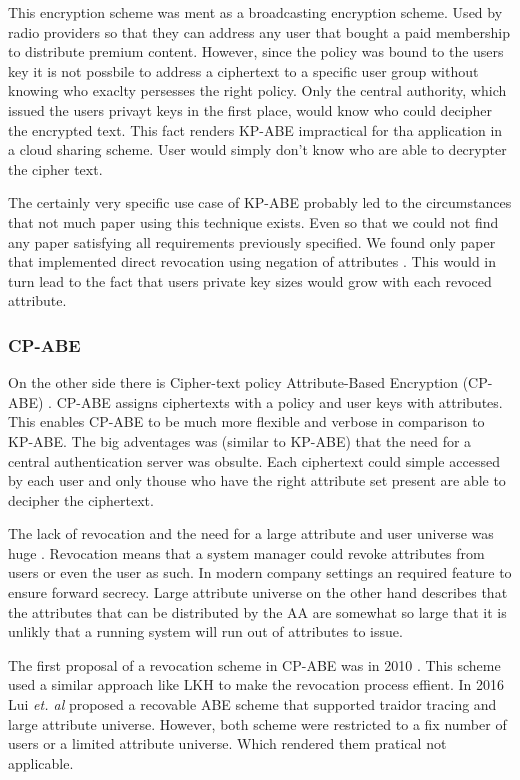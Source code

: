 This encryption scheme was ment as a broadcasting encryption scheme. Used by radio providers so that they can address any user that bought a paid membership to distribute premium content. However, since the policy was bound to the users key it is not possbile to address a ciphertext to a specific user group without knowing who exaclty persesses the right policy. Only the central authority, which issued the users privayt keys in the first place, would know who could decipher the encrypted text. This fact renders \ac{KP-ABE} impractical for tha application in a cloud sharing scheme. User would simply don't know who are able to decrypter the cipher text. 

The certainly very specific use case of \ac{KP-ABE} probably led to the circumstances that not much paper using this technique exists. Even so that we could not find any paper satisfying all requirements previously specified. We found only paper that implemented direct revocation using negation of attributes \cite{lewko2010revocation}. This would in turn lead to the fact that users private key sizes would grow with each revoced attribute. 

\subsubsection{\ac{CP-ABE}}
On the other side there is Cipher-text policy Attribute-Based Encryption (\ac{CP-ABE}) \cite{bethencourt2007ciphertext}. \ac{CP-ABE} assigns ciphertexts with a policy and user keys with attributes. This enables \ac{CP-ABE} to be much more flexible and verbose in comparison to \ac{KP-ABE}. The big adventages was (similar to \ac{KP-ABE}) that the need for a central authentication server was obsulte. Each ciphertext could simple accessed by each user and only thouse who have the right attribute set present are able to decipher the ciphertext. 

The lack of revocation  and the need for a large attribute and user universe was huge . Revocation means that a system manager could revoke attributes from users or even the user as such. In modern company settings an required feature to ensure forward secrecy. Large attribute universe on the other hand describes that the attributes that can be distributed by the \ac{AA} are somewhat so large that it is unlikly that a running system will run out of attributes to issue. 

The first proposal of a revocation scheme in \ac{CP-ABE} was in 2010 \cite{liang2010ciphertext}. This scheme used a similar approach like \ac{LKH} to make the revocation process effient. In 2016 Lui \textit{et. al} \cite{liu2016practical} proposed a recovable \ac{ABE} scheme that supported traidor tracing and large attribute universe. However, both scheme were restricted to a fix number of users or a limited attribute universe. Which rendered them pratical not applicable.  

